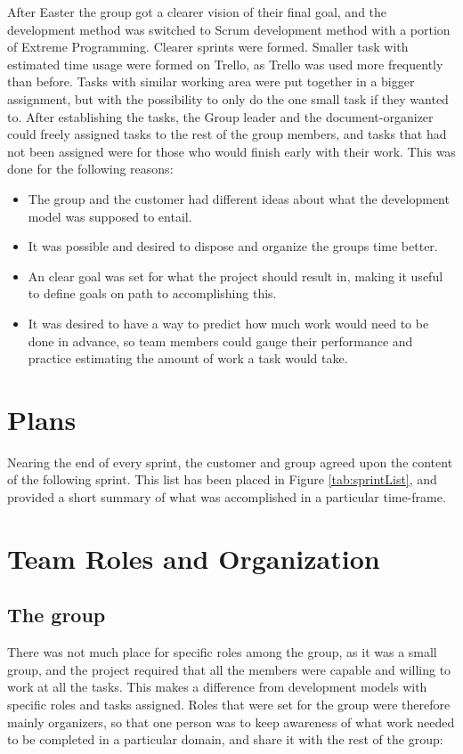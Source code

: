 After Easter the group got a clearer vision of their final goal, and the development method was switched to Scrum development method with a portion of Extreme Programming. Clearer sprints were formed. Smaller task with estimated time usage were formed on Trello, as Trello was used more frequently than before. Tasks with similar working area were put together in a bigger assignment, but with the possibility to only do the one small task if they wanted to. After establishing the tasks, the Group leader \pageref{def:the group} and the document-organizer\pageref{def:the group} could freely assigned tasks to the rest of the group members, and tasks that had not been assigned were for those who would finish early with their work. This was done for the following reasons:
\begin{itemize}
\item The group and the customer had different ideas about what the development model was supposed to entail.
\item It was possible and desired to dispose and organize the groups time better.
\item An clear goal was set for what the project should result in, making it useful to define goals on path to accomplishing this.
\item It was desired to have a way to predict how much work would need to be done in advance, so team members could gauge their performance and practice estimating the amount of work a task would take. 
\end{itemize}


\section{Plans}

Nearing the end of every sprint, the customer and group agreed upon the content of the following sprint. This list has been placed in Figure \ref{tab:sprintList}, and provided a short summary of what was accomplished in a particular time-frame. 


\section{Team Roles and Organization}
\subsection{The group} \label{def:the group}
There was not much place for specific roles among the group, as it was a small group, and the project required that all the members were capable and willing to work at all the tasks. This makes a difference from development models with specific roles and tasks assigned. Roles that were set for the group were therefore mainly organizers, so that one person was to keep awareness of what work needed to be completed in a particular domain, and share it with the rest of the group:

